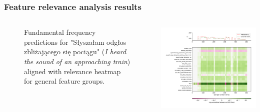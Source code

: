 \documentclass[a4paper,9pt]{beamer}
\theoremstyle{mytheoremstyle}
\begin{document}
\begin{frame}
\frametitle{Feature relevance analysis results}
\begin{columns}
\begin{figure}
	\caption{Fundamental frequency predictions for "S\l{}ysza\l{}am odg\l{}os zbli\.zaj\k{a}cego si\k{e} poci\k{a}gu" (\textit{I heard the sound of an approaching train}) aligned with relevance heatmap for general feature groups.}
\end{figure}
\begin{center}
  \includegraphics[width=\textwidth]{res/general_feature_categories_amu_pl_ilo_baza_2006a_zbitki_a0036}
\end{center}
\end{columns}
\end{frame}
\end{document}
